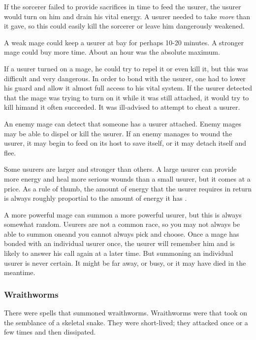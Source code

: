 If the sorcerer failed to provide sacrifices in time to feed the usurer, the usurer would turn on him and drain his vital energy. 
A usurer needed to take \emph{more} than it gave, so this could easily kill the sorcerer or leave him dangerously weakened. 

A weak mage could keep a usurer at bay for perhaps 10-20 minutes. 
A stronger mage could buy more time. 
About an hour was the absolute maximum. 

If a usurer turned on a mage, he could try to repel it or even kill it, but this was difficult and very dangerous. 
In order to bond with the usurer, one had to lower his guard and allow it almost full access to his vital system. 
If the usurer detected that the mage was trying to turn on it while it was still attached, it would try to kill him\dash and it often succeeded.
It was ill-advised to attempt to cheat a usurer. 

An enemy mage can detect that someone has a usurer attached. 
Enemy mages may be able to dispel or kill the usurer. 
If an enemy manages to wound the usurer, it may begin to feed on its host to save itself, or it may detach itself and flee. 

Some usurers are larger and stronger than others. 
A large usurer can provide more energy and heal more serious wounds than a small usurer, but it comes at a price.
As a rule of thumb, the amount of energy that the usurer requires in return is always roughly proportial to the amount of energy it has . 

A more powerful mage can summon a more powerful usurer, but this is always somewhat random.
Usurers are not a common race, so you may not always be able to summon one\dash and you cannot always pick and choose.  
Once a mage has bonded with an individual usurer once, the usurer will remember him and is likely to answer his call again at a later time. 
But summoning an individual usurer is never certain. 
It might be far away, or busy, or it may have died in the meantime. 





\subsubsection{Wraithworms}
There were spells that summoned wraithworms. 
Wraithworms were \daemons that took on the semblance of a skeletal snake. 
They were short-lived; they attacked once or a few times and then dissipated. 

